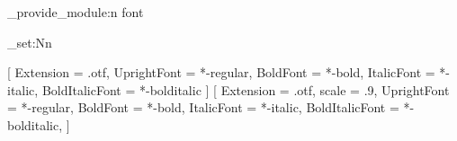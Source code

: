\hduthesis_provide_module:n {font}

\linespread{1.39}
\dim_set:Nn \parindent {2\ccwd}
\newcommand\semilarge{\@setfontsize\semilarge{14}{16.5}}
\newcommand\semiLarge{\@setfontsize\semiLarge{16.5}{18}}

\setmainfont{texgyretermes}
  [
    Extension = .otf, UprightFont = *-regular, BoldFont = *-bold,
    ItalicFont = *-italic, BoldItalicFont = *-bolditalic
  ]
\setsansfont{texgyreheros}
  [
    Extension = .otf, scale = .9, UprightFont = *-regular, BoldFont = *-bold,
    ItalicFont = *-italic, BoldItalicFont = *-bolditalic,
  ]

\RequirePackage { amsmath, amssymb, mathtools, extarrows,
                  bm, cancel, physics2, fixdif, derivative }
\RequirePackage
  [ warnings-off = { mathtools-colon, mathtools-overbracket } ]
  {unicode-math}

\endinput
